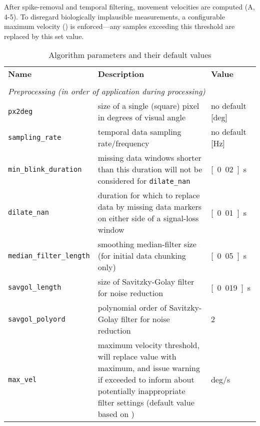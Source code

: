 After spike-removal and temporal filtering, movement velocities are computed
(A, 4-5). To disregard biologically implausible measurements, a
configurable maximum velocity () is enforced---any samples
exceeding this threshold are replaced by this set value.

\begin{table*}[tbp]
  \caption{Algorithm parameters and their default values}
  \label{tab:parameters}
  \small
  \begin{tabular}{lp{85mm}l}
    \textbf{Name} & \textbf{Description} & \textbf{Value} \\
    & & \\
    \multicolumn{3}{l}{\textit{Preprocessing (in order of application during processing)}} \\
    \texttt{px2deg} &
    size of a single (square) pixel in degrees of visual angle &
    no default [\unit{deg}]\\
    \texttt{sampling\_rate} &
    temporal data sampling rate/frequency &
    no default [\unit{Hz}]\\
    \texttt{min\_blink\_duration} &
    missing data windows shorter than this duration will not be considered for \texttt{dilate\_nan}&
    \unit[0.02]{s}\\
    \texttt{dilate\_nan} &
    duration for which to replace data by missing data markers on either side of a
    signal-loss window &
    \unit[0.01]{s}\\
    \texttt{median\_filter\_length} &
    smoothing median-filter size (for initial data chunking only) &
    \unit[0.05]{s}\\
    \texttt{savgol\_length} &
    size of Savitzky-Golay filter for noise reduction&
    \unit[0.019]{s}\\
    \texttt{savgol\_polyord} &
    polynomial order of Savitzky-Golay filter for noise reduction&
    2\\
    \texttt{max\_vel} &
    maximum velocity threshold, will replace value with maximum, and issue
    warning if exceeded to inform about
    potentially inappropriate filter settings
    (default value based on \cite{holmqvist2011eye})&
    \unit[1000]{deg/s}\\


\end{tabular}
\end{table*}
